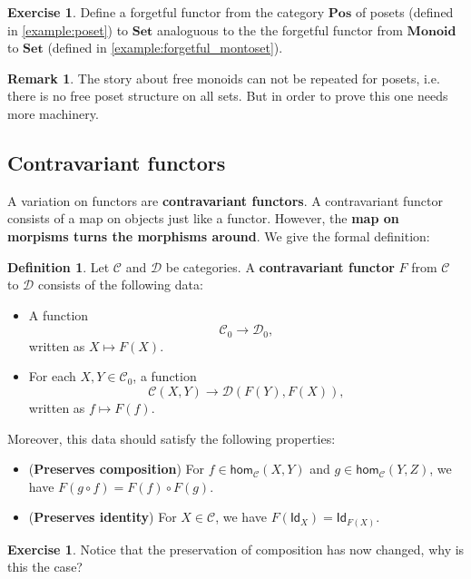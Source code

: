 \documentclass[a4paper,10pt]{scrartcl}
\theoremstyle{plain}
\theoremstyle{definition}
\newtheorem{rem}[thm]{Remark}
\newtheorem{dfn}[thm]{Definition}
\newtheorem{exer}[thm]{Exercise}
\newcommand{\cfont}[1]{\ensuremath{\mathsf{#1}}}
\newcommand{\Cat}[1]{\mathcal{#1}}
\newcommand{\CC}{\Cat{C}}
\newcommand{\DD}{\Cat{D}}
\newcommand{\Catb}[1]{\mathbf{#1}}
\newcommand{\SET}{\Catb{Set}}
\newcommand{\POS}{\Catb{Pos}}
\newcommand{\MON}{\Catb{Monoid}}
\newcommand{\Ob}[1]{{#1}_0}
\newcommand{\Hom}[3][]{\cfont{hom}_{#1}(#2,#3)}
\newcommand{\CHom}[3]{{#1}(#2,#3)}
\newcommand{\Id}[1][]{\cfont{Id}_{#1}}
\newcommand{\co}[2]{\ensuremath{#2 \circ #1}}
\begin{document}
\begin{exer} Define a forgetful functor from the category $\POS$ of posets (defined in \cref{example:poset}) to $\SET$ analoguous to the the forgetful functor from $\MON$ to $\SET$ (defined in \cref{example:forgetful_montoset}).
\end{exer}
\begin{rem} The story about free monoids can not be repeated for posets, i.e. there is no free poset structure on all sets. But in order to prove this one needs more machinery.
\end{rem}


\subsection{Contravariant functors}

A variation on functors are \textbf{contravariant functors}.
A contravariant functor consists of a map on objects just like a functor.
However, the \textbf{map on morpisms turns the morphisms around}.
We give the formal definition:

\begin{dfn} Let $\CC$ and $\DD$ be categories. A \textbf{contravariant functor} $F$ from $\CC$ to $\DD$ consists of the following data:
\begin{itemize}
\item A function 
\[
\Ob{\CC} \to \Ob{\DD},
\]
written as $X\mapsto F(X)$.
\item For each $X,Y\in \Ob{\CC}$, a function
\[
\CHom{\CC}{X}{Y} \to \CHom{\DD}{F(Y)}{F(X)},
\]
written as $f\mapsto F(f)$.
\end{itemize}
Moreover, this data should satisfy the following properties:
\begin{itemize}
\item (\textbf{Preserves composition}) For $f\in \Hom[\CC]{X}{Y}$ and $g\in \Hom[\CC]{Y}{Z}$, we have $F(\co f g) =  \co {F(g)}{F(f)}$.
\item (\textbf{Preserves identity}) For $X\in\CC$, we have $F(\Id[X]) = \Id[F(X)]$.
\end{itemize}
\end{dfn}

\begin{exer} Notice that the preservation of composition has now changed, why is this the case?
\end{exer}
\end{document}

